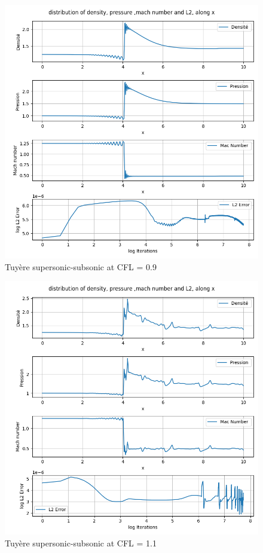 \documentclass[12pt]{article}
\begin{document}
\begin{figure}[H] %
    \centering
    \includegraphics[width=\textwidth,height=\textheight,keepaspectratio]{PLOTS/Tuyere_super_sub_Macormack_CFL09.png}
    \caption{Tuyère supersonic-subsonic at CFL = 0.9}
    \label{fig:your_label}
\end{figure}

\begin{figure}[H] %
    \centering
    \includegraphics[width=\textwidth,height=\textheight,keepaspectratio]{PLOTS/Tuyere_super_sub_Macormack_CFL11.png}
    \caption{Tuyère supersonic-subsonic at CFL = 1.1}
    \label{fig:your_label}
\end{figure}
\end{document}
